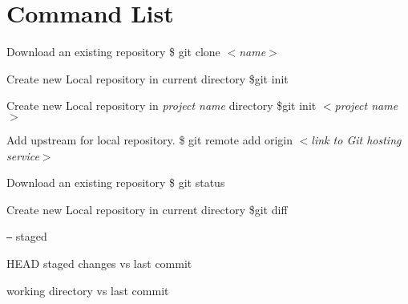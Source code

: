 \chapter*{Command List}
\twocolumn

\begin{tcolorbox}[ titleBox, title=SETUP]
    \begin{tcolorbox}[innerBox]
        Download an existing repository
      \tcblower
        \$ git clone $<$\textit{name}$>$
    \end{tcolorbox}

    \begin{tcolorbox}[innerBox]
        Create new Local repository in current directory
      \tcblower
        \$git init
    \end{tcolorbox}
    
    \begin{tcolorbox}[innerBox]
        Create new Local repository in \textit{project name} directory
      \tcblower
        \$git init $<$\textit{project name}$>$
    \end{tcolorbox}

    \begin{tcolorbox}[innerBox]
        Add upstream for local repository.
      \tcblower
        \$ git remote add origin $<$\textit{link to Git hosting service}$>$
    \end{tcolorbox}
\end{tcolorbox}


\begin{tcolorbox}[ titleBox, title=SNAPSHOT]
    \begin{tcolorbox}[innerBox]
        Download an existing repository
      \tcblower
        \$ git status
    \end{tcolorbox}

    \begin{tcolorbox}[innerBox]
        Create new Local repository in current directory
      \tcblower
        \$git diff
    \end{tcolorbox}
        
    \begin{tcolorbox}[splitBox, lefthand ratio=0.25, fontupper = \small, fontlower = \small]
        \texttt{--}  staged 
        \par\vspace{3mm}
        HEAD
      \tcblower
        staged changes vs last commit
        \par\vspace{3mm}
        working directory vs last commit
    \end{tcolorbox}
\end{tcolorbox}


